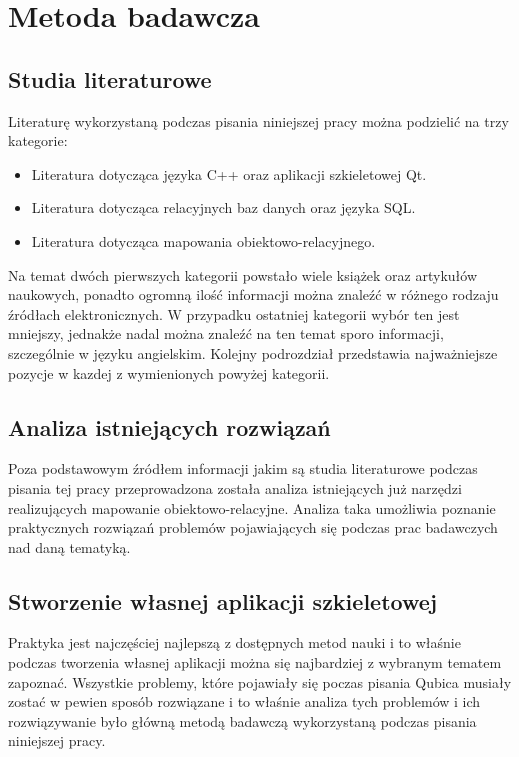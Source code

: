 \documentclass[12pt]{report}
\begin{document}
\section{Metoda badawcza}

\subsection{Studia literaturowe}

Literaturę wykorzystaną podczas pisania niniejszej pracy można podzielić na trzy kategorie:

\begin{itemize}
\item Literatura dotycząca języka C++ oraz aplikacji szkieletowej Qt.
\item Literatura dotycząca relacyjnych baz danych oraz języka SQL.
\item Literatura dotycząca mapowania obiektowo-relacyjnego.
\end{itemize}

Na temat dwóch pierwszych kategorii powstało wiele książek oraz artykułów naukowych, ponadto ogromną ilość informacji można znaleźć w różnego rodzaju źródłach
elektronicznych. W przypadku ostatniej kategorii wybór ten jest mniejszy, jednakże nadal można znaleźć na ten temat sporo informacji, szczególnie w języku angielskim.
Kolejny podrozdział przedstawia najważniejsze pozycje w kazdej z wymienionych powyżej kategorii.

\subsection{Analiza istniejących rozwiązań}

Poza podstawowym źródłem informacji jakim są studia literaturowe podczas pisania tej pracy przeprowadzona została analiza istniejących już narzędzi realizujących mapowanie
obiektowo-relacyjne. Analiza taka umożliwia poznanie praktycznych rozwiązań problemów pojawiających się podczas prac badawczych nad daną tema\-tyką.

\subsection{Stworzenie własnej aplikacji szkieletowej}

Praktyka jest najczęściej najlepszą z dostępnych metod nauki i to właśnie podczas tworzenia własnej aplikacji można się najbardziej z wybranym tematem zapoznać. Wszystkie 
problemy, które pojawiały się poczas pisania Qubica musiały zostać w pewien sposób rozwiązane i to właśnie analiza tych problemów i ich rozwiązywanie było główną metodą
badawczą wykorzystaną podczas pisania niniejszej pracy.
\end{document}
